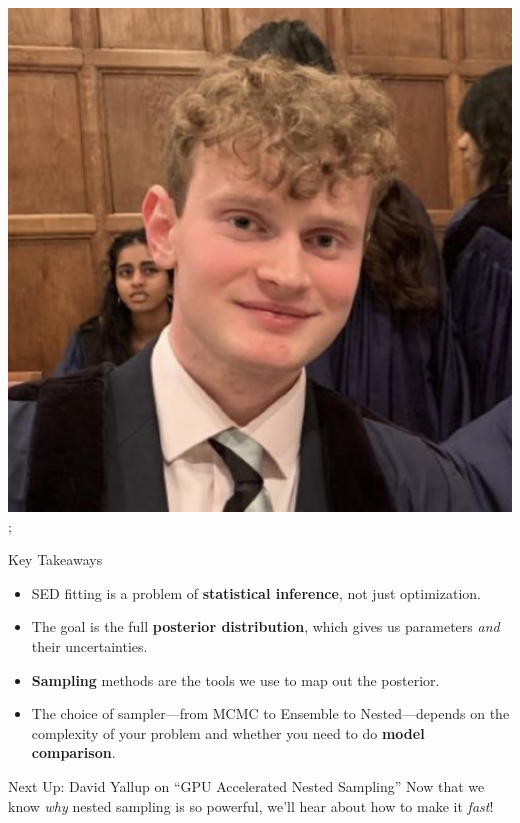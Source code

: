 \documentclass[aspectratio=169]{beamer}
\newcommand{\keyterm}[1]{\textbf{\textcolor{C0}{#1}}}
\begin{document}
\begin{frame}
{        \includegraphics[width=0.06\textheight]{people/will_templeton.jpg}%
    };
    
    \begin{block}{Key Takeaways}
        \begin{itemize}
            \item SED fitting is a problem of \keyterm{statistical inference}, not just optimization.
            \item The goal is the full \keyterm{posterior distribution}, which gives us parameters \textit{and} their uncertainties.
            \item \keyterm{Sampling} methods are the tools we use to map out the posterior.
            \item The choice of sampler—from MCMC to Ensemble to Nested—depends on the complexity of your problem and whether you need to do \keyterm{model comparison}.
        \end{itemize}
    \end{block}
    
    \begin{alertblock}{Next Up: David Yallup on ``GPU Accelerated Nested Sampling''}
        Now that we know \textit{why} nested sampling is so powerful, we'll hear about how to make it \textit{fast}!
    \end{alertblock}
\end{frame}
\end{document}
